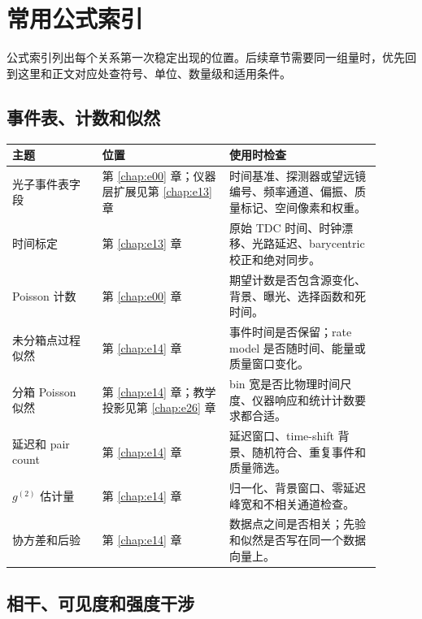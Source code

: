\chapter{常用公式索引}
\label{app:a}

公式索引列出每个关系第一次稳定出现的位置。后续章节需要同一组量时，优先回到这里和正文对应处查符号、单位、数量级和适用条件。

\section{事件表、计数和似然}
\label{appsec:a-observables}

\begin{longtable}{p{0.22\linewidth}p{0.31\linewidth}p{0.37\linewidth}}
\toprule
主题 & 位置 & 使用时检查 \\
\midrule
光子事件表字段 & 第 \ref{chap:e00} 章；仪器层扩展见第 \ref{chap:e13} 章 & 时间基准、探测器或望远镜编号、频率通道、偏振、质量标记、空间像素和权重。 \\
时间标定 & 第 \ref{chap:e13} 章 & 原始 TDC 时间、时钟漂移、光路延迟、barycentric 校正和绝对同步。 \\
Poisson 计数 & 第 \ref{chap:e00} 章 & 期望计数是否包含源变化、背景、曝光、选择函数和死时间。 \\
未分箱点过程似然 & 第 \ref{chap:e14} 章 & 事件时间是否保留；rate model 是否随时间、能量或质量窗口变化。 \\
分箱 Poisson 似然 & 第 \ref{chap:e14} 章；教学投影见第 \ref{chap:e26} 章 & bin 宽是否比物理时间尺度、仪器响应和统计计数要求都合适。 \\
延迟和 pair count & 第 \ref{chap:e14} 章 & 延迟窗口、time-shift 背景、随机符合、重复事件和质量筛选。 \\
\(g^{(2)}\) 估计量 & 第 \ref{chap:e14} 章 & 归一化、背景窗口、零延迟峰宽和不相关通道检查。 \\
协方差和后验 & 第 \ref{chap:e14} 章 & 数据点之间是否相关；先验和似然是否写在同一个数据向量上。 \\
\bottomrule
\end{longtable}

\section{相干、可见度和强度干涉}
\label{appsec:a-coherence}

